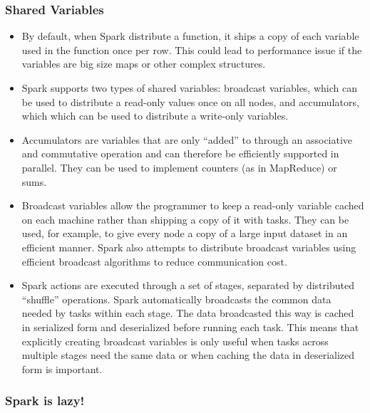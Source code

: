 \subsubsection{Shared Variables}

\begin{itemize}
	\item By default, when Spark distribute a function, it ships a copy of each variable used in the function once per row. This could lead to performance issue if the variables are big size maps or other complex structures.
	\item Spark supports two types of shared variables: broadcast variables, which can be used to distribute a read-only values once on all nodes, and accumulators, which which can be used to distribute a write-only variables.
	\item Accumulators are variables that are only “added” to through an associative and commutative operation and can therefore be efficiently supported in parallel. They can be used to implement counters (as in MapReduce) or sums.
	\item Broadcast variables allow the programmer to keep a read-only variable cached on each machine rather than shipping a copy of it with tasks. They can be used, for example, to give every node a copy of a large input dataset in an efficient manner. Spark also attempts to distribute broadcast variables using efficient broadcast algorithms to reduce communication cost.
	\item Spark actions are executed through a set of stages, separated by distributed “shuffle” operations. Spark automatically broadcasts the common data needed by tasks within each stage. The data broadcasted this way is cached in serialized form and deserialized before running each task. This means that explicitly creating broadcast variables is only useful when tasks across multiple stages need the same data or when caching the data in deserialized form is important.
\end{itemize}

\subsubsection{Spark is lazy!}

